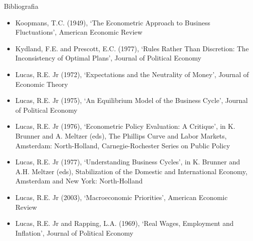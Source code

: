 \documentclass[10pt]{beamer}
\begin{document}
\begin{frame}{ Bibliografia}
    \begin{itemize}                        
        \item Koopmans, T.C. (1949), ‘The Econometric Approach to Business Fluctuations’, American Economic Review\medskip        
        \item Kydland, F.E. and Prescott, E.C. (1977), ‘Rules Rather Than Discretion: The Inconsistency of Optimal Plans’, Journal of Political Economy\medskip
        \item Lucas, R.E. Jr (1972), ‘Expectations and the Neutrality of Money’, Journal of Economic Theory\medskip
        \item Lucas, R.E. Jr (1975), ‘An Equilibrium Model of the Business Cycle’, Journal of Political Economy\medskip
        \item Lucas, R.E. Jr (1976), ‘Econometric Policy Evaluation: A Critique’, in K. Brunner and A. Meltzer (eds), The Phillips Curve and Labor Markets, Amsterdam: North-Holland, Carnegie-Rochester Series on Public Policy\medskip
        \item Lucas, R.E. Jr (1977), ‘Understanding Business Cycles’, in K. Brunner and A.H. Meltzer (eds), Stabilization of the Domestic and International Economy, Amsterdam and New York: North-Holland\medskip
        \item Lucas, R.E. Jr (2003), ‘Macroeconomic Priorities’, American Economic Review\medskip
        \item Lucas, R.E. Jr and Rapping, L.A. (1969), ‘Real Wages, Employment and Inflation’, Journal of Political Economy\medskip        
    \end{itemize}
\end{frame}
\end{document}
